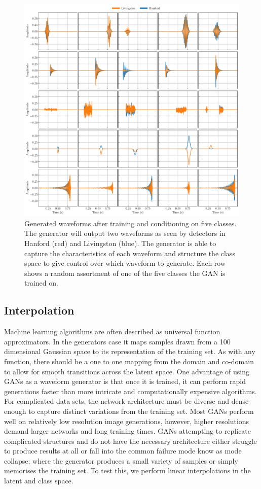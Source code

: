 \documentclass[12pt]{iopart}
\begin{document}
\begin{figure}[ht]
    \centering
    \includegraphics[width=\textwidth]{figures/conditional_gens.pdf}
    \caption{Generated waveforms after training and conditioning on five classes. The generator will output two waveforms as seen by detectors in Hanford (red) and Livingston (blue). The generator is able to capture the characteristics of each waveform and structure the class space to give control over which waveform to generate. Each row shows a random assortment of one of the five classes the GAN is trained on. }
    \label{fig:gen_signals}
\end{figure}

\subsection{Interpolation}
Machine learning algorithms are often described as universal function approximators. In the generators case it maps samples drawn from a 100 dimensional Gaussian space to its representation of the training set. As with any function, there should be a one to one mapping from the domain and co-domain to allow for smooth transitions across the latent space. One advantage of using GANs as a waveform generator is that once it is trained, it can perform rapid generations faster than more intricate and computationally expensive algorithms. For complicated data sets, the network architecture must be diverse and dense enough to capture distinct variations from the training set. Most GANs perform well on relatively low resolution image generations, however, higher resolutions demand larger networks and long training times. GANs attempting to replicate complicated structures and do not have the necessary architecture either struggle to produce results at all or fall into the common failure mode know as mode collapse; where the generator produces a small variety of samples or simply memorises the training set. To test this, we perform linear interpolations in the latent and class space. 
\end{document}
